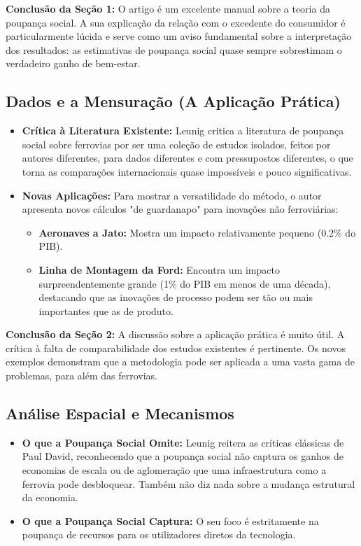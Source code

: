 \documentclass[12pt, a4paper]{article}
\begin{document}
\noindent\textbf{Conclusão da Seção 1:} O artigo é um excelente manual sobre a teoria da poupança social. A sua explicação da relação com o excedente do consumidor é particularmente lúcida e serve como um aviso fundamental sobre a interpretação dos resultados: as estimativas de poupança social quase sempre sobrestimam o verdadeiro ganho de bem-estar.

\subsection{Dados e a Mensuração (A Aplicação Prática)}

\begin{itemize}
    \item \textbf{Crítica à Literatura Existente:} Leunig critica a literatura de poupança social sobre ferrovias por ser uma coleção de estudos isolados, feitos por autores diferentes, para dados diferentes e com pressupostos diferentes, o que torna as comparações internacionais quase impossíveis e pouco significativas.
    \item \textbf{Novas Aplicações:} Para mostrar a versatilidade do método, o autor apresenta novos cálculos "de guardanapo" para inovações não ferroviárias:
        \begin{itemize}
            \item \textbf{Aeronaves a Jato:} Mostra um impacto relativamente pequeno (0.2\% do PIB).
            \item \textbf{Linha de Montagem da Ford:} Encontra um impacto surpreendentemente grande (1\% do PIB em menos de uma década), destacando que as inovações de processo podem ser tão ou mais importantes que as de produto.
        \end{itemize}
\end{itemize}

\noindent\textbf{Conclusão da Seção 2:} A discussão sobre a aplicação prática é muito útil. A crítica à falta de comparabilidade dos estudos existentes é pertinente. Os novos exemplos demonstram que a metodologia pode ser aplicada a uma vasta gama de problemas, para além das ferrovias.

\subsection{Análise Espacial e Mecanismos}

\begin{itemize}
    \item \textbf{O que a Poupança Social Omite:} Leunig reitera as críticas clássicas de Paul David, reconhecendo que a poupança social não captura os ganhos de economias de escala ou de aglomeração que uma infraestrutura como a ferrovia pode desbloquear. Também não diz nada sobre a mudança estrutural da economia.
    \item \textbf{O que a Poupança Social Captura:} O seu foco é estritamente na poupança de recursos para os utilizadores diretos da tecnologia.
\end{itemize}
\end{document}
